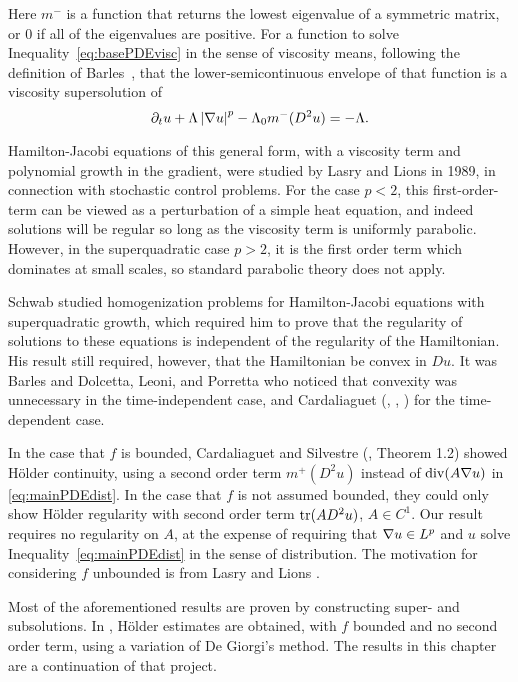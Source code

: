Here $m^-$ is a function that returns the lowest eigenvalue of a symmetric matrix, or 0 if all of the eigenvalues are positive.  For a function to solve Inequality~\eqref{eq:basePDEvisc} in the sense of viscosity means, following the definition of Barles~\cite{Ba.viscosity}, that the lower-semicontinuous envelope of that function is a viscosity supersolution of 
\[ \partial_t u + \Lambda \left\lvert \nabla u \right\rvert^p - \Lambda_0 m^-(D^2 u) = -\Lambda. \]

Hamilton-Jacobi equations of this general form, with a viscosity term and polynomial growth in the gradient, were studied by Lasry and Lions \cite{LaLi.nonlinear} in 1989, in connection with stochastic control problems.  For the case $p < 2$, this first-order-term can be viewed as a perturbation of a simple heat equation, and indeed solutions will be regular so long as the viscosity term is uniformly parabolic.  However, in the superquadratic case $p > 2$, it is the first order term which dominates at small scales, so standard parabolic theory does not apply.  

Schwab \cite{Sc} studied homogenization problems for Hamilton-Jacobi equations with superquadratic growth, which required him to prove that the regularity of solutions to these equations is independent of the regularity of the Hamiltonian.  His result still required, however, that the Hamiltonian be convex in $Du$.  It was Barles \cite{Ba.hamjac} and Dolcetta, Leoni, and Porretta \cite{DoLePo} who noticed that convexity was unnecessary in the time-independent case, and Cardaliaguet (\cite{Ca}, \cite{CaCa}, \cite{CaSi.hamjac}) for the time-dependent case.  

In the case that $f$ is bounded, Cardaliaguet and Silvestre (\cite{CaSi.hamjac}, Theorem 1.2) showed H\"{o}lder continuity, using a second order term $m^+(D^2 u)$ instead of $\operatorname{div}(A \nabla u)$ in \eqref{eq:mainPDEdist}.  In the case that $f$ is not assumed bounded, they could only show H\"{o}lder regularity with second order term $\operatorname{tr}(A D^2 u)$, $A \in C^1$.  Our result requires no regularity on $A$, at the expense of requiring that $\nabla u \in L^p$ and $u$ solve Inequality~\eqref{eq:mainPDEdist} in the sense of distribution.  The motivation for considering $f$ unbounded is from Lasry and Lions \cite{LaLi.meanfield}.  

Most of the aforementioned results are proven by constructing super- and subsolutions.  In \cite{ChVa}, H\"{o}lder estimates are obtained, with $f$ bounded and no second order term, using a variation of De Giorgi's method.  The results in this chapter are a continuation of that project.  

